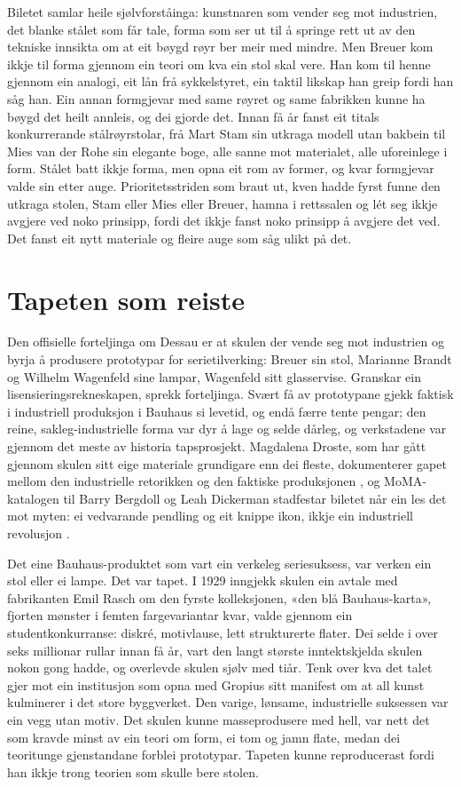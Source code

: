 Biletet samlar heile sjølvforståinga: kunstnaren som vender seg mot industrien, det blanke stålet som får tale, forma som ser ut til å springe rett ut av den tekniske innsikta om at eit bøygd røyr ber meir med mindre. Men Breuer kom ikkje til forma gjennom ein teori om kva ein stol skal vere. Han kom til henne gjennom ein analogi, eit lån frå sykkelstyret, ein taktil likskap han greip fordi han såg han. Ein annan formgjevar med same røyret og same fabrikken kunne ha bøygd det heilt annleis, og dei gjorde det. Innan få år fanst eit titals konkurrerande stålrøyrstolar, frå Mart Stam sin utkraga modell utan bakbein til Mies van der Rohe sin elegante boge, alle sanne mot materialet, alle uforeinlege i form. Stålet batt ikkje forma, men opna eit rom av former, og kvar formgjevar valde sin etter auge. Prioritetsstriden som braut ut, kven hadde fyrst funne den utkraga stolen, Stam eller Mies eller Breuer, hamna i rettssalen og lét seg ikkje avgjere ved noko prinsipp, fordi det ikkje fanst noko prinsipp å avgjere det ved. Det fanst eit nytt materiale og fleire auge som såg ulikt på det.

\section{Tapeten som reiste}

Den offisielle forteljinga om Dessau er at skulen der vende seg mot industrien og byrja å produsere prototypar for serietilverking: Breuer sin stol, Marianne Brandt og Wilhelm Wagenfeld sine lampar, Wagenfeld sitt glasservise. Granskar ein lisensieringsrekneskapen, sprekk forteljinga. Svært få av prototypane gjekk faktisk i industriell produksjon i Bauhaus si levetid, og endå færre tente pengar; den reine, sakleg-industrielle forma var dyr å lage og selde dårleg, og verkstadene var gjennom det meste av historia tapsprosjekt. Magdalena Droste, som har gått gjennom skulen sitt eige materiale grundigare enn dei fleste, dokumenterer gapet mellom den industrielle retorikken og den faktiske produksjonen \autocite{droste2002bauhaus}, og MoMA-katalogen til Barry Bergdoll og Leah Dickerman stadfestar biletet når ein les det mot myten: ei vedvarande pendling og eit knippe ikon, ikkje ein industriell revolusjon \autocite{bergdoll2009bauhaus}.

Det eine Bauhaus-produktet som vart ein verkeleg seriesuksess, var verken ein stol eller ei lampe. Det var tapet. I 1929 inngjekk skulen ein avtale med fabrikanten Emil Rasch om den fyrste kolleksjonen, «den blå Bauhaus-karta», fjorten mønster i femten fargevariantar kvar, valde gjennom ein studentkonkurranse: diskré, motivlause, lett strukturerte flater. Dei selde i over seks millionar rullar innan få år, vart den langt største inntektskjelda skulen nokon gong hadde, og overlevde skulen sjølv med tiår. Tenk over kva det talet gjer mot ein institusjon som opna med Gropius sitt manifest om at all kunst kulminerer i det store byggverket. Den varige, lønsame, industrielle suksessen var ein vegg utan motiv. Det skulen kunne masseprodusere med hell, var nett det som kravde minst av ein teori om form, ei tom og jamn flate, medan dei teoritunge gjenstandane forblei prototypar. Tapeten kunne reproducerast fordi han ikkje trong teorien som skulle bere stolen.

